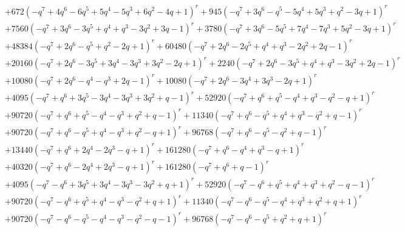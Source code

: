 \documentclass[11pt,english]{amsart}
\numberwithin{equation}{section}
\numberwithin{figure}{section}
\theoremstyle{plain}
\theoremstyle{plain}
\theoremstyle{definition}
\theoremstyle{remark}
\begin{document}
{\begin{align*}
& + 672 {\left(-q^{7} + 4 q^{6} - 6 q^{5} + 5 q^{4} - 5 q^{3} + 6 q^{2} - 4 q + 1\right)}^{r} + 945 {\left(-q^{7} + 3 q^{6} - q^{5} - 5 q^{4} + 5 q^{3} + q^{2} - 3 q + 1\right)}^{r} \\
& + 7560 {\left(-q^{7} + 3 q^{6} - 3 q^{5} + q^{4} + q^{3} - 3 q^{2} + 3 q - 1\right)}^{r} + 3780 {\left(-q^{7} + 3 q^{6} - 5 q^{5} + 7 q^{4} - 7 q^{3} + 5 q^{2} - 3 q + 1\right)}^{r} \\
& + 48384 {\left(-q^{7} + 2 q^{6} - q^{5} + q^{2} - 2 q + 1\right)}^{r} + 60480 {\left(-q^{7} + 2 q^{6} - 2 q^{5} + q^{4} + q^{3} - 2 q^{2} + 2 q - 1\right)}^{r} \\
& + 20160 {\left(-q^{7} + 2 q^{6} - 3 q^{5} + 3 q^{4} - 3 q^{3} + 3 q^{2} - 2 q + 1\right)}^{r} + 2240 {\left(-q^{7} + 2 q^{6} - 3 q^{5} + q^{4} + q^{3} - 3 q^{2} + 2 q - 1\right)}^{r} \\
& + 10080 {\left(-q^{7} + 2 q^{6} - q^{4} - q^{3} + 2 q - 1\right)}^{r} + 10080 {\left(-q^{7} + 2 q^{6} - 3 q^{4} + 3 q^{3} - 2 q + 1\right)}^{r} \\
& + 4095 {\left(-q^{7} + q^{6} + 3 q^{5} - 3 q^{4} - 3 q^{3} + 3 q^{2} + q - 1\right)}^{r} + 52920 {\left(-q^{7} + q^{6} + q^{5} - q^{4} + q^{3} - q^{2} - q + 1\right)}^{r} \\
& + 90720 {\left(-q^{7} + q^{6} + q^{5} - q^{4} - q^{3} + q^{2} + q - 1\right)}^{r} + 11340 {\left(-q^{7} + q^{6} - q^{5} + q^{4} + q^{3} - q^{2} + q - 1\right)}^{r} \\
& + 90720 {\left(-q^{7} + q^{6} - q^{5} + q^{4} - q^{3} + q^{2} - q + 1\right)}^{r} + 96768 {\left(-q^{7} + q^{6} - q^{5} - q^{2} + q - 1\right)}^{r} \\
& + 13440 {\left(-q^{7} + q^{6} + 2 q^{4} - 2 q^{3} - q + 1\right)}^{r} + 161280 {\left(-q^{7} + q^{6} - q^{4} + q^{3} - q + 1\right)}^{r} \\
& + 40320 {\left(-q^{7} + q^{6} - 2 q^{4} + 2 q^{3} - q + 1\right)}^{r} + 161280 {\left(-q^{7} + q^{6} + q - 1\right)}^{r} \\
& + 4095 {\left(-q^{7} - q^{6} + 3 q^{5} + 3 q^{4} - 3 q^{3} - 3 q^{2} + q + 1\right)}^{r} + 52920 {\left(-q^{7} - q^{6} + q^{5} + q^{4} + q^{3} + q^{2} - q - 1\right)}^{r} \\
& + 90720 {\left(-q^{7} - q^{6} + q^{5} + q^{4} - q^{3} - q^{2} + q + 1\right)}^{r} + 11340 {\left(-q^{7} - q^{6} - q^{5} - q^{4} + q^{3} + q^{2} + q + 1\right)}^{r} \\
& + 90720 {\left(-q^{7} - q^{6} - q^{5} - q^{4} - q^{3} - q^{2} - q - 1\right)}^{r} + 96768 {\left(-q^{7} - q^{6} - q^{5} + q^{2} + q + 1\right)}^{r} \\

\end{align*}}
\end{document}
